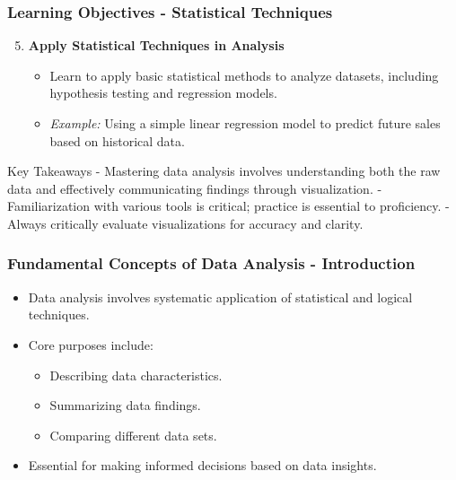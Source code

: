 \documentclass{beamer}
\begin{document}
\begin{frame}[fragile]
    \frametitle{Learning Objectives - Statistical Techniques}
    \begin{enumerate}
        \setcounter{enumi}{4}
        \item \textbf{Apply Statistical Techniques in Analysis}
        \begin{itemize}
            \item Learn to apply basic statistical methods to analyze datasets, including hypothesis testing and regression models.
            \item \textit{Example:} Using a simple linear regression model to predict future sales based on historical data.
        \end{itemize}
    \end{enumerate}
    
    \begin{block}{Key Takeaways}
        - Mastering data analysis involves understanding both the raw data and effectively communicating findings through visualization.
        - Familiarization with various tools is critical; practice is essential to proficiency.
        - Always critically evaluate visualizations for accuracy and clarity.
    \end{block}
\end{frame}

\begin{frame}[fragile]
    \frametitle{Fundamental Concepts of Data Analysis - Introduction}
    \begin{itemize}
        \item Data analysis involves systematic application of statistical and logical techniques.
        \item Core purposes include:
        \begin{itemize}
            \item Describing data characteristics.
            \item Summarizing data findings.
            \item Comparing different data sets.
        \end{itemize}
        \item Essential for making informed decisions based on data insights.
    \end{itemize}
\end{frame}
\end{document}
